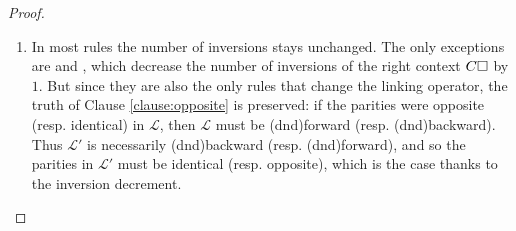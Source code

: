 \begin{proof}
\begin{enumerate}[itemsep=0.8em]
\begin{itemize}
      \begin{enumerate}[itemsep=0.4em]
        \renewcommand{\labelenumii}{\theenumii}
        \renewcommand{\theenumii}{\arabic{enumii}.}
            
        \item In most rules the number of inversions stays unchanged. The only
        exceptions are  and , which
        decrease the number of inversions of the right context $C\square$ by $1$.
        But since they are also the only rules that change the linking operator,
        the truth of Clause \ref{clause:opposite} is preserved: if the parities
        were opposite (resp. identical) in $\mathcal{L}$, then $\mathcal{L}$
        must be \kl(dnd){forward} (resp. \kl(dnd){backward}). Thus $\mathcal{L'}$ is necessarily
        \kl(dnd){backward} (resp. \kl(dnd){forward}), and so the parities in $\mathcal{L'}$ must be
        identical (resp. opposite), which is the case thanks to the inversion
        decrement.


\end{enumerate}
\end{itemize}
\end{enumerate}
\end{proof}
